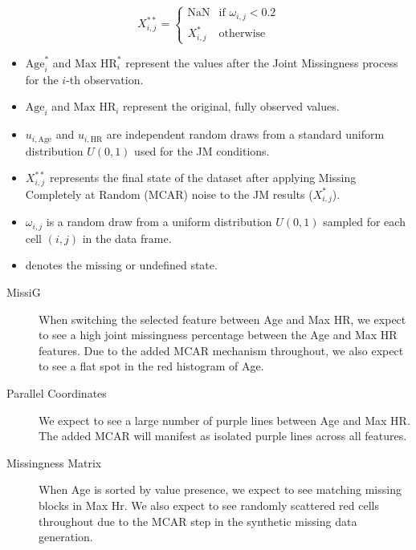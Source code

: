 \documentclass[a4paper, 11pt]{article}
\begin{document}
\begin{equation}
    X_{i,j}^{**} = 
    \begin{cases} 
    \text{NaN} & \text{if } \omega_{i,j} < 0.2 \\ 
    X_{i,j}^* & \text{otherwise} 
    \end{cases}
\end{equation}

\begin{itemize}
    \item $\text{Age}_i^*$ and $\text{Max HR}_i^*$ represent the values after
            the Joint Missingness process for the $i$-th observation.
    \item $\text{Age}_i$ and $\text{Max HR}_i$ represent the original, fully
            observed values.
    \item $u_{i, \text{Age}}$ and $u_{i, \text{HR}}$ are independent random
            draws from a standard uniform distribution $U(0,1)$ used for the JM
            conditions.
    \item $X_{i,j}^{**}$ represents the final state of the dataset after
            applying Missing Completely at Random (MCAR) noise to the JM
            results ($X_{i,j}^*$).
    \item $\omega_{i,j}$ is a random draw from a uniform distribution $U(0,1)$
            sampled for each cell $(i,j)$ in the data frame. 
    \item {} denotes the missing or undefined state.
\end{itemize}


\begin{description}
        \item [MissiG] When switching the selected feature between Age and Max
                HR, we expect to see a high joint missingness percentage
                between the Age and Max HR features. Due to the added MCAR
                mechanism throughout, we also expect to see a flat spot
                in the red histogram of Age. 

        \item [Parallel Coordinates] 
                We expect to see a large number of purple lines between Age
                and Max HR. The added MCAR will manifest as isolated purple
                lines across all features.

        \item [Missingness Matrix] 
                When Age is sorted by value presence, we expect to see matching
                missing blocks in Max Hr. We also expect to see randomly
                scattered red cells throughout due to the MCAR step in the
                synthetic missing data generation.
\end{description}
\end{document}
